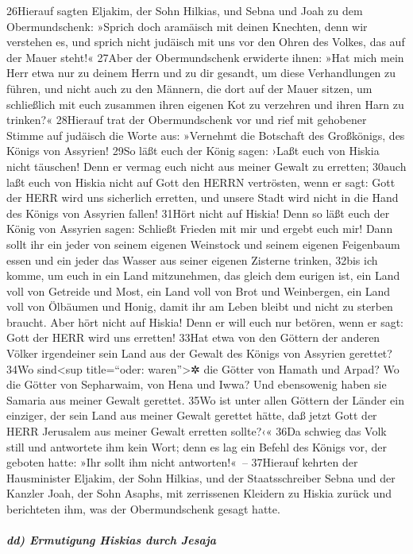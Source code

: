 26Hierauf sagten Eljakim, der Sohn Hilkias, und Sebna und Joah zu dem
Obermundschenk: »Sprich doch aramäisch mit deinen Knechten, denn wir
verstehen es, und sprich nicht judäisch mit uns vor den Ohren des
Volkes, das auf der Mauer steht!« 27Aber der Obermundschenk erwiderte
ihnen: »Hat mich mein Herr etwa nur zu deinem Herrn und zu dir gesandt,
um diese Verhandlungen zu führen, und nicht auch zu den Männern, die
dort auf der Mauer sitzen, um schließlich mit euch zusammen ihren
eigenen Kot zu verzehren und ihren Harn zu trinken?« 28Hierauf trat der
Obermundschenk vor und rief mit gehobener Stimme auf judäisch die Worte
aus: »Vernehmt die Botschaft des Großkönigs, des Königs von Assyrien!
29So läßt euch der König sagen: ›Laßt euch von Hiskia nicht täuschen!
Denn er vermag euch nicht aus meiner Gewalt zu erretten; 30auch laßt
euch von Hiskia nicht auf Gott den HERRN vertrösten, wenn er sagt: Gott
der HERR wird uns sicherlich erretten, und unsere Stadt wird nicht in
die Hand des Königs von Assyrien fallen! 31Hört nicht auf Hiskia! Denn
so läßt euch der König von Assyrien sagen: Schließt Frieden mit mir und
ergebt euch mir! Dann sollt ihr ein jeder von seinem eigenen Weinstock
und seinem eigenen Feigenbaum essen und ein jeder das Wasser aus seiner
eigenen Zisterne trinken, 32bis ich komme, um euch in ein Land
mitzunehmen, das gleich dem eurigen ist, ein Land voll von Getreide und
Most, ein Land voll von Brot und Weinbergen, ein Land voll von Ölbäumen
und Honig, damit ihr am Leben bleibt und nicht zu sterben braucht. Aber
hört nicht auf Hiskia! Denn er will euch nur betören, wenn er sagt: Gott
der HERR wird uns erretten! 33Hat etwa von den Göttern der anderen
Völker irgendeiner sein Land aus der Gewalt des Königs von Assyrien
gerettet? 34Wo sind\textless sup title=``oder: waren''\textgreater✲ die
Götter von Hamath und Arpad? Wo die Götter von Sepharwaim, von Hena und
Iwwa? Und ebensowenig haben sie Samaria aus meiner Gewalt gerettet. 35Wo
ist unter allen Göttern der Länder ein einziger, der sein Land aus
meiner Gewalt gerettet hätte, daß jetzt Gott der HERR Jerusalem aus
meiner Gewalt erretten sollte?‹« 36Da schwieg das Volk still und
antwortete ihm kein Wort; denn es lag ein Befehl des Königs vor, der
geboten hatte: »Ihr sollt ihm nicht antworten!«~-- 37Hierauf kehrten der
Hausminister Eljakim, der Sohn Hilkias, und der Staatsschreiber Sebna
und der Kanzler Joah, der Sohn Asaphs, mit zerrissenen Kleidern zu
Hiskia zurück und berichteten ihm, was der Obermundschenk gesagt hatte.

\hypertarget{dd-ermutigung-hiskias-durch-jesaja}{%
\subparagraph{dd) Ermutigung Hiskias durch
Jesaja}\label{dd-ermutigung-hiskias-durch-jesaja}}

